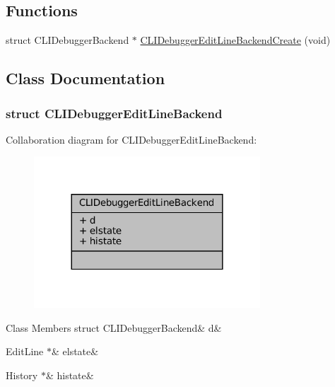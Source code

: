 \subsection*{Functions}
\begin{DoxyCompactItemize}
\item 
struct C\+L\+I\+Debugger\+Backend $\ast$ \mbox{\hyperlink{cli-el-backend_8h_aea9ca36da1b56d3b608e61aba06b9044}{C\+L\+I\+Debugger\+Edit\+Line\+Backend\+Create}} (void)
\end{DoxyCompactItemize}


\subsection{Class Documentation}
\label{struct_c_l_i_debugger_edit_line_backend}
\subsubsection{struct C\+L\+I\+Debugger\+Edit\+Line\+Backend}


Collaboration diagram for C\+L\+I\+Debugger\+Edit\+Line\+Backend\+:
\nopagebreak
\begin{figure}[H]
\begin{center}
\leavevmode
\includegraphics[width=240pt]{struct_c_l_i_debugger_edit_line_backend__coll__graph}
\end{center}
\end{figure}
\begin{DoxyFields}{Class Members}
\mbox{\label{cli-el-backend_8h_a9da599b9732b8c51d696ea87b148c547}} 
struct CLIDebuggerBackend&
d&
\\
\hline

\mbox{\label{cli-el-backend_8h_a822b6c429531efe9e0784e6b55bb229f}} 
EditLine $\ast$&
elstate&
\\
\hline

\mbox{\label{cli-el-backend_8h_abf8f807ed4a6d7e464808dbf45fbf0c8}} 
History $\ast$&
histate&
\\
\hline

\end{DoxyFields}


